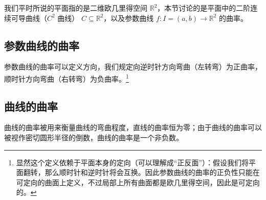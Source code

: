 
\begin{issues}
\issueDraft
\end{issues}


我们平时所说的平面指的是二维欧几里得空间 $\mathbb{R}^2$，本节讨论的是平面中的二阶连续可导曲线（$C^2$ 曲线） $C \subseteq \mathbb{R}^2$，以及参数曲线 $f: I = (a, b) \to \mathbb{R}^2$ 的曲率。

\subsection{参数曲线的曲率}

参数曲线的曲率可以定义方向，我们规定向逆时针方向弯曲（左转弯）为正曲率，顺时针方向弯曲（右转弯）为负曲率。\footnote{显然这个定义依赖于平面本身的定向（可以理解成“正反面”）：假设我们将平面翻转，那么顺时针和逆时针将会互换。因此参数曲线的曲率的正负性只能在可定向的曲面上定义，不过局部上所有曲面都是欧几里得空间，因此是可定向的。}

\subsection{曲线的曲率}

曲线的曲率被用来衡量曲线的弯曲程度，直线的曲率恒为零；由于曲线的曲率可以被视作密切圆形半径的倒数，曲线的曲率是一个非负数。
